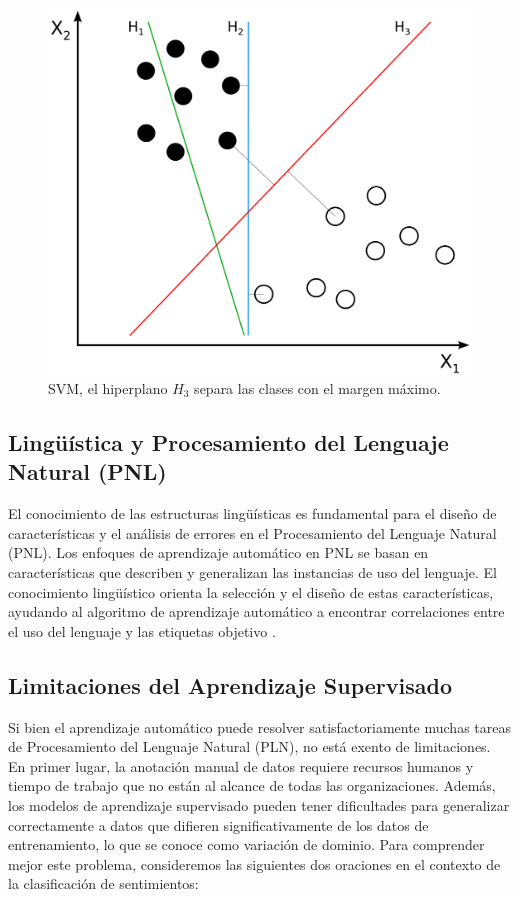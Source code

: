 \begin{figure}[h]
\centering
\includegraphics[scale = 0.15]{pics/SVM.png}
\caption{SVM, el hiperplano $H_3$ separa las clases con el margen máximo.}
\label{fig:svm}
\end{figure}





\subsection{Lingüística y Procesamiento del Lenguaje Natural (PNL)}

El conocimiento de las estructuras lingüísticas es fundamental para el diseño de características y el análisis de errores en el Procesamiento del Lenguaje Natural (PNL). Los enfoques de aprendizaje automático en PNL se basan en características que describen y generalizan las instancias de uso del lenguaje. El conocimiento lingüístico orienta la selección y el diseño de estas características, ayudando al algoritmo de aprendizaje automático a encontrar correlaciones entre el uso del lenguaje y las etiquetas objetivo \cite{bender2013linguistic}.

\subsection{Limitaciones del Aprendizaje Supervisado}

Si bien el aprendizaje automático puede resolver satisfactoriamente muchas tareas de Procesamiento del Lenguaje Natural (PLN), no está exento de limitaciones. En primer lugar, la anotación manual de datos requiere recursos humanos y tiempo de trabajo que no están al alcance de todas las organizaciones. Además, los modelos de aprendizaje supervisado pueden tener dificultades para generalizar correctamente a datos que difieren significativamente de los datos de entrenamiento, lo que se conoce como variación de dominio. Para comprender mejor este problema, consideremos las siguientes dos oraciones en el contexto de la clasificación de sentimientos:

